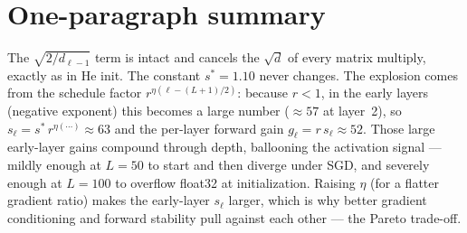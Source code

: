 \documentclass[11pt]{article}
\newcommand{\sstar}{s^{*}}
\begin{document}
\section{One-paragraph summary}

The $\sqrt{2/d_{\ell-1}}$ term is intact and cancels the $\sqrt{d}$ of every matrix
multiply, exactly as in He init. The constant $\sstar=1.10$ never changes. The
explosion comes from the schedule factor $r^{\eta(\ell-(L+1)/2)}$: because $r<1$, in
the early layers (negative exponent) this becomes a large number ($\approx 57$ at
layer~2), so $s_\ell = \sstar\,r^{\eta(\cdots)} \approx 63$ and the per-layer forward
gain $g_\ell = r\,s_\ell \approx 52$. Those large early-layer gains compound through
depth, ballooning the activation signal --- mildly enough at $L=50$ to start and then
diverge under SGD, and severely enough at $L=100$ to overflow float32 at
initialization. Raising $\eta$ (for a flatter gradient ratio) makes the early-layer
$s_\ell$ larger, which is why better gradient conditioning and forward stability pull
against each other --- the Pareto trade-off.
\end{document}
